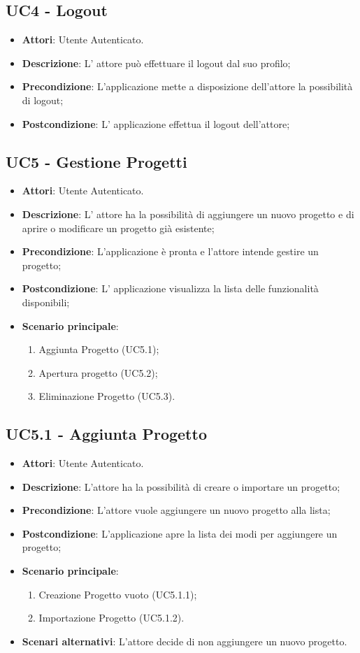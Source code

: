 \subsection{UC4 - Logout} 
\label{ssec:UC4} 
\begin{itemize} 
\item \textbf{Attori}: Utente Autenticato.
\item \textbf{Descrizione}: L' attore può effettuare il logout dal suo profilo;
\item \textbf{Precondizione}: L’applicazione mette a disposizione dell’attore la possibilità di logout;
\item \textbf{Postcondizione}: L' applicazione effettua il logout dell'attore;
\end{itemize} 
\subsection{UC5 - Gestione Progetti} 
\label{ssec:UC5} 
\begin{itemize} 
\item \textbf{Attori}: Utente Autenticato.
\item \textbf{Descrizione}: L’ attore ha la possibilità di aggiungere un nuovo progetto e di aprire o modificare un progetto già esistente;
\item \textbf{Precondizione}: L'applicazione è pronta e l'attore intende gestire un progetto;
\item \textbf{Postcondizione}: L’ applicazione visualizza la lista delle funzionalità disponibili;
\item \textbf{Scenario principale}: \begin{enumerate}\item Aggiunta Progetto (UC5.1);\item Apertura progetto (UC5.2);\item Eliminazione Progetto (UC5.3). 
 \end{enumerate}
\end{itemize} 
\subsection{UC5.1 - Aggiunta Progetto} 
\label{ssec:UC5.1} 
\begin{itemize} 
\item \textbf{Attori}: Utente Autenticato.
\item \textbf{Descrizione}: L’attore ha la possibilità di creare o importare un progetto;
\item \textbf{Precondizione}: L’attore vuole aggiungere un nuovo progetto alla lista;
\item \textbf{Postcondizione}: L’applicazione apre la lista dei modi per aggiungere un progetto;
\item \textbf{Scenario principale}: \begin{enumerate}\item Creazione Progetto vuoto (UC5.1.1);\item Importazione Progetto (UC5.1.2). 
 \end{enumerate}
\item \textbf{Scenari alternativi}: L'attore decide di non aggiungere un nuovo progetto.
\end{itemize} 
